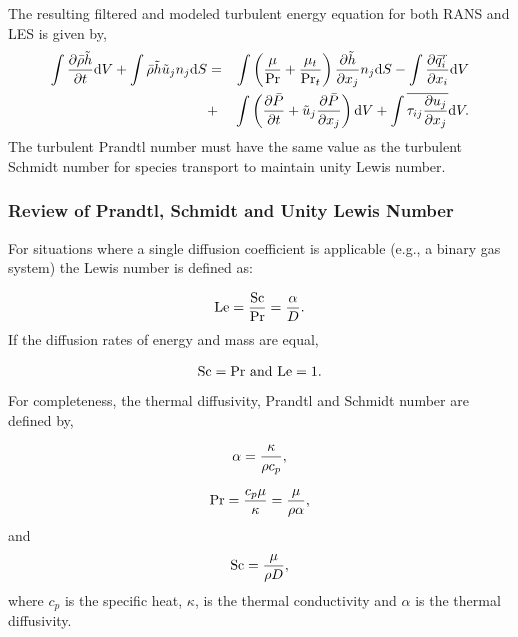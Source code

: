 The resulting filtered and modeled turbulent energy equation for both RANS
and LES is given by,
%
\begin{eqnarray}
\int {{\partial \bar{\rho} \tilde{h}} \over {\partial t}} {\rm d}V
   + \int \bar{\rho} \tilde{h} \tilde{u}_j n_j {\rm d}S 
 &=& \int \left( {\mu \over {\rm Pr}} + {{\mu_t} \over {{\rm Pr}_t}} \right) 
     {{\partial \tilde{h}} \over {\partial x_j}}  n_j {\rm d}S 
   - \int {{\partial \bar{q}_i^r} \over {\partial x_i}} {\rm d}V \nonumber \\
 &+& \int \left({{\partial \bar{P}} \over {\partial t}} + \tilde{u}_j 
     {{\partial \bar{P}} \over {\partial x_j}}\right){\rm d}V
   + \int \overline{\tau_{ij} {{\partial u_j} \over {\partial x_j }}} {\rm d}V.
\label{mod-enth}
\end{eqnarray}
%
The turbulent Prandtl number must have the same value as
the turbulent Schmidt number for species transport to maintain unity Lewis
number.

\subsubsection{Review of Prandtl, Schmidt and Unity Lewis Number}

For situations where a single diffusion coefficient is applicable (e.g., a binary gas system) the Lewis number is defined as:

\begin{eqnarray}
{\rm Le} = {{\rm Sc} \over {\rm Pr}} = {{\alpha} \over {D}}. 
\label{lewisNumber}
\end{eqnarray}
%
If the diffusion rates of energy and mass are equal, 

\begin{eqnarray}
{\rm Sc = Pr \ and \ Le = 1}. 
\label{lewisNumberUnity}
\end{eqnarray}
%
For completeness, the thermal diffusivity, Prandtl and Schmidt number are defined by,

\begin{eqnarray}
\alpha = {{\kappa} \over {\rho c_p}},
\label{thermalDiff}
\end{eqnarray}

\begin{eqnarray}
{\rm Pr} = {{c_p \mu } \over {\kappa}} = {{\mu} \over {\rho \alpha}},
\label{prandtl}
\end{eqnarray}
%
and
\begin{eqnarray}
{\rm Sc} = {{\mu } \over {\rho D}}, 
\label{schmidt}
\end{eqnarray}
where $c_p$ is the specific heat, $\kappa$, is the thermal conductivity and
$\alpha$ is the thermal diffusivity.


